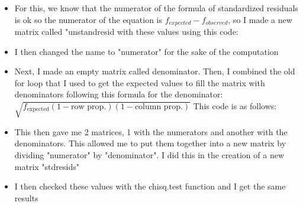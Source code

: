 \documentclass[12pt,letterpaper]{article}
\begin{document}
\begin{enumerate}
		\begin{itemize}
			\item  For this, we know that the numerator of the formula of standardized residuals is ok so the numerator of the equation is $f_{expected} - f_{observed}$, so I made a new matrix called "unstandresid with these values using this code:
				
			\item I then changed the name to "numerator" for the sake of the computation
				
			\item Next, I made an empty matrix called denominator. Then, I combined the old for loop that I used to get the expected values to fill the matrix with denominators following this formula for the denominator: $\sqrt{f_{\text{expected}}(1 - \text{row prop.})(1 - \text{column prop.})}$ This code is as follows:
				
				
			\item This then gave me 2 matrices, 1 with the numerators and another with the denominators. This allowed me to put them together into a new matrix by dividing "numerator" by "denominator". I did this in the creation of a new matrix "stdresids"
				
			\item I then checked these values with the chisq.test function and I get the same results
				
				
		\end{itemize}
		

\end{enumerate}
\end{document}
